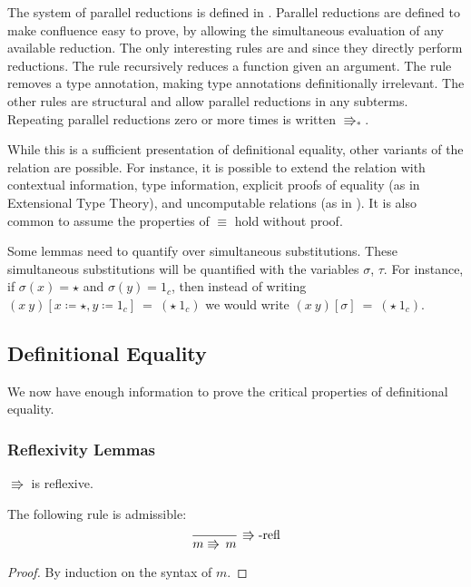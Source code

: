 The system of parallel reductions is defined in .
Parallel reductions are defined to make confluence easy to prove, by allowing the simultaneous evaluation of any available reduction.
The only interesting rules are  and  since they directly perform reductions.
The  rule recursively reduces a function given an argument.
The  rule removes a type annotation, making type annotations definitionally irrelevant.
The other rules are structural and allow parallel reductions in any subterms.
Repeating parallel reductions zero or more times is written $\Rrightarrow_{\ast}$.
 
While this is a sufficient presentation of definitional equality, other variants of the relation are possible.
For instance, it is possible to extend the relation with contextual information, type information, explicit proofs of equality (as in Extensional Type Theory), and uncomputable relations (as in \cite{jia2010dependent}).
It is also common to assume the properties of $\equiv$ hold without proof.
 
Some lemmas need to quantify over simultaneous substitutions.
These simultaneous substitutions will be quantified with the variables $\sigma$, $\tau$.
For instance, if $\sigma(x) = \star$ and $\sigma(y) = 1_c$, then instead of writing $(x\ y)[x \coloneqq \star,y \coloneqq 1_c]\ =\ (\star\ 1_c)$ we would write $(x\ y)[\sigma]\ =\ (\star\ 1_c)$.
 
 
\subsection{Definitional Equality}
 
We now have enough information to prove the critical properties of definitional equality.

 
\subsubsection{Reflexivity Lemmas}
\begin{lem}
$\Rrightarrow$ is reflexive.

The following rule is admissible:
\[
\frac{\,}{m\Rrightarrow\,m}\,\operatorname{\Rrightarrow-refl}
\]
\end{lem}
\begin{proof}
By induction on the syntax of $m$.
\end{proof}

